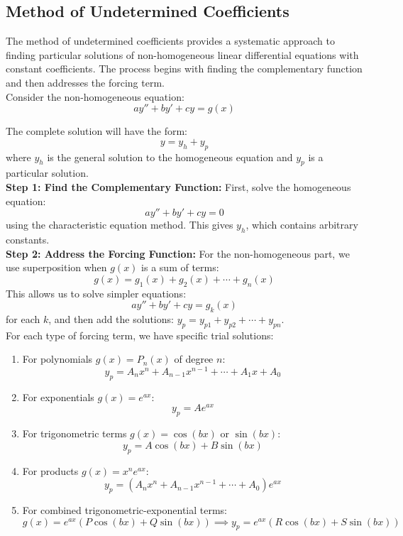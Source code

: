 \subsection*{Method of Undetermined Coefficients} 

\noindent The method of undetermined coefficients provides a systematic approach to finding particular solutions of non-homogeneous linear differential equations with constant coefficients. The process begins with finding the complementary function and then addresses the forcing term. \\

\noindent Consider the non-homogeneous equation:
\[
ay'' + by' + cy = g(x)
\]

\noindent The complete solution will have the form:
\[
y = y_h + y_p
\]
where $y_h$ is the general solution to the homogeneous equation and $y_p$ is a particular solution. \\

\noindent \textbf{Step 1: Find the Complementary Function:} First, solve the homogeneous equation:
\[
ay'' + by' + cy = 0
\]
using the characteristic equation method. This gives $y_h$, which contains arbitrary constants. \\

\noindent \textbf{Step 2: Address the Forcing Function:} For the non-homogeneous part, we use superposition when $g(x)$ is a sum of terms:
\[
g(x) = g_1(x) + g_2(x) + \cdots + g_n(x)
\]
This allows us to solve simpler equations:
\[
ay'' + by' + cy = g_k(x)
\]
for each $k$, and then add the solutions: $y_p = y_{p1} + y_{p2} + \cdots + y_{pn}$. \\

\noindent For each type of forcing term, we have specific trial solutions:

\begin{enumerate}
    \item For polynomials $g(x) = P_n(x)$ of degree $n$:
       \[
       y_p = A_nx^n + A_{n-1}x^{n-1} + \cdots + A_1x + A_0
       \]
       
    \item For exponentials $g(x) = e^{ax}$:
       \[
       y_p = Ae^{ax}
       \]
       
    \item For trigonometric terms $g(x) = \cos(bx)$ or $\sin(bx)$:
       \[
       y_p = A\cos(bx) + B\sin(bx)
       \]
       
    \item For products $g(x) = x^ne^{ax}$:
       \[
       y_p = (A_nx^n + A_{n-1}x^{n-1} + \cdots + A_0)e^{ax}
       \]
       
    \item For combined trigonometric-exponential terms:
       \[
       g(x) = e^{ax}(P\cos(bx) + Q\sin(bx)) \implies y_p = e^{ax}(R\cos(bx) + S\sin(bx))
       \]
\end{enumerate}

